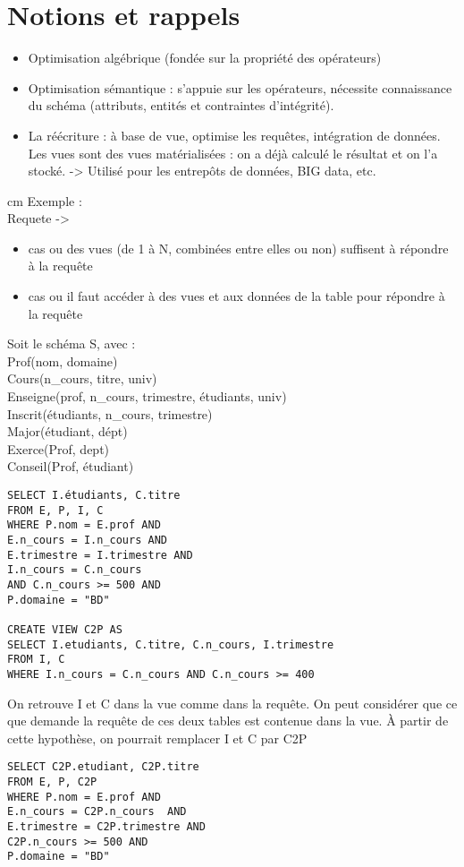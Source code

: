 {\newpage
\section{Notions et rappels}
\begin{itemize}
	\item Optimisation algébrique (fondée sur la propriété des opérateurs)
	\item Optimisation sémantique : s'appuie sur les opérateurs, nécessite connaissance du schéma (attributs, entités et contraintes d'intégrité).
	\item La réécriture : à base de vue, optimise les requêtes, intégration de données. Les vues sont des vues matérialisées : on a déjà calculé le résultat et on l'a stocké. -> Utilisé pour les entrepôts de données, BIG data, etc.
\end{itemize}

 cm
Exemple :\\
Requete ->
\begin{itemize}
	\item cas ou des vues (de 1 à N, combinées entre elles ou non) suffisent à répondre à la requête
	\item cas ou il faut accéder à des vues et aux données de la table pour répondre à la requête
\end{itemize}

\vskip 2cm
Soit le schéma S, avec :\\
Prof(nom, domaine)\\
Cours(n\_cours, titre, univ)\\
Enseigne(prof, n\_cours, trimestre, étudiants, univ)\\
Inscrit(étudiants, n\_cours, trimestre)\\
Major(étudiant, dépt)\\
Exerce(Prof, dept)\\
Conseil(Prof, étudiant)\\

\begin{verbatim}
SELECT I.étudiants, C.titre
FROM E, P, I, C
WHERE P.nom = E.prof AND
E.n_cours = I.n_cours AND
E.trimestre = I.trimestre AND
I.n_cours = C.n_cours
AND C.n_cours >= 500 AND
P.domaine = "BD"

CREATE VIEW C2P AS
SELECT I.etudiants, C.titre, C.n_cours, I.trimestre
FROM I, C
WHERE I.n_cours = C.n_cours AND C.n_cours >= 400

\end{verbatim}

On retrouve I et C dans la vue comme dans la requête. On peut considérer que ce que demande la requête de ces deux tables est contenue dans la vue. À partir de cette hypothèse, on pourrait remplacer I et C par C2P
\begin{verbatim}
SELECT C2P.etudiant, C2P.titre
FROM E, P, C2P
WHERE P.nom = E.prof AND
E.n_cours = C2P.n_cours  AND
E.trimestre = C2P.trimestre AND
C2P.n_cours >= 500 AND
P.domaine = "BD"
\end{verbatim}

}
